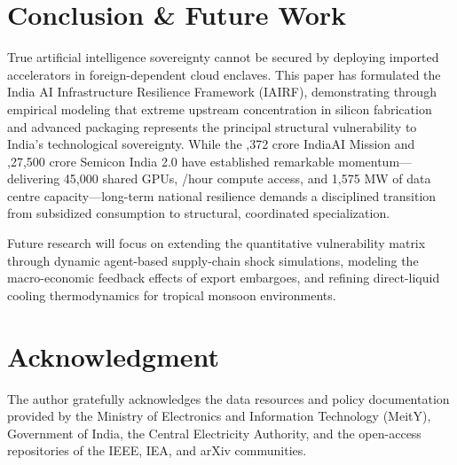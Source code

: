 \documentclass[conference,a4paper]{IEEEtran}
\begin{document}
\section{Conclusion \& Future Work}
True artificial intelligence sovereignty cannot be secured by deploying imported accelerators in foreign-dependent cloud enclaves. This paper has formulated the India AI Infrastructure Resilience Framework (IAIRF), demonstrating through empirical modeling that extreme upstream concentration in silicon fabrication and advanced packaging represents the principal structural vulnerability to India's technological sovereignty. While the ,372 crore IndiaAI Mission and ,27,500 crore Semicon India 2.0 have established remarkable momentum—delivering 45,000 shared GPUs, /hour compute access, and 1,575 MW of data centre capacity—long-term national resilience demands a disciplined transition from subsidized consumption to structural, coordinated specialization.

Future research will focus on extending the quantitative vulnerability matrix through dynamic agent-based supply-chain shock simulations, modeling the macro-economic feedback effects of export embargoes, and refining direct-liquid cooling thermodynamics for tropical monsoon environments.

\section*{Acknowledgment}
The author gratefully acknowledges the data resources and policy documentation provided by the Ministry of Electronics and Information Technology (MeitY), Government of India, the Central Electricity Authority, and the open-access repositories of the IEEE, IEA, and arXiv communities.



\end{document}
